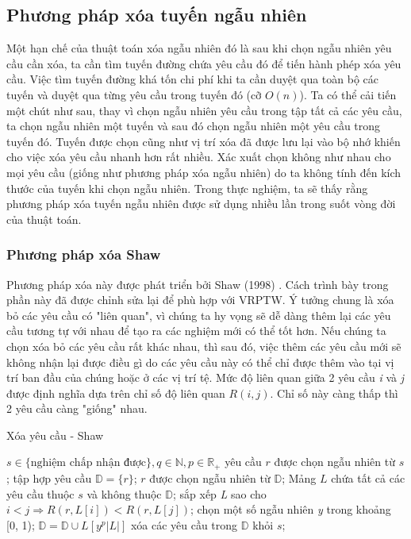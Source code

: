 \subsection*{Phương pháp xóa tuyến ngẫu nhiên}
Một hạn chế của thuật toán xóa ngẫu nhiên đó là sau khi chọn ngẫu nhiên yêu cầu cần xóa, ta cần tìm tuyến đường chứa yêu cầu đó để tiến hành phép xóa yêu cầu. Việc tìm tuyến đường khá tốn chi phí khi ta cần duyệt qua toàn bộ các tuyến và duyệt qua từng yêu cầu trong tuyến đó (cỡ $O(n)$). Ta có thể cải tiến một chút như sau, thay vì chọn ngẫu nhiên yêu cầu trong tập tất cả các yêu cầu, ta chọn ngẫu nhiên một tuyến và sau đó chọn ngẫu nhiên một yêu cầu trong tuyến đó. Tuyến được chọn cũng như vị trí xóa đã được lưu lại vào bộ nhớ khiến cho việc xóa yêu cầu nhanh hơn rất nhiều. Xác xuất chọn không như nhau cho mọi yêu cầu (giống như phương pháp xóa ngẫu nhiên) do ta không tính đến kích thước của tuyến khi chọn ngẫu nhiên. Trong thực nghiệm, ta sẽ thấy rằng phương pháp xóa tuyến ngẫu nhiên được sử dụng nhiều lần trong suốt vòng đời của thuật toán.

\subsubsection*{Phương pháp xóa Shaw}
Phương pháp xóa này được phát triển bởi Shaw (1998) \cite{shaw1998using}. Cách trình bày trong phần này đã được chỉnh sửa lại để phù hợp với VRPTW. Ý tưởng chung là xóa bỏ các yêu cầu có "liên quan", vì chúng ta hy vọng sẽ dễ dàng thêm lại các yêu cầu tương tự với nhau để tạo ra các nghiệm mới có thể tốt hơn. Nếu chúng ta chọn xóa bỏ các yêu cầu rất khác nhau, thì sau đó, việc thêm các yêu cầu mới sẽ không nhận lại được điều gì do các yêu cầu này có thể chỉ được thêm vào tại vị trí ban đầu của chúng hoặc ở các vị trí tệ. Mức độ liên quan giữa 2 yêu cầu \textit{i} và \textit{j} được định nghĩa dựa trên chỉ số độ liên quan $R(i,j)$. Chỉ số này càng thấp thì 2 yêu cầu càng "giống" nhau.

\begin{algorithm}
	\caption{Xóa yêu cầu - Shaw}
	\begin{algorithmic}[1]
		\Require $s \in \text{\{nghiệm chấp nhận được\}}, q \in \mathbb{N}, p \in \mathbb{R}_{+}$
		\State yêu cầu $r$ được chọn ngẫu nhiên từ $s$;
		\State tập hợp yêu cầu $\mathbb{D}=\{r\}$;
		\State $r$ được chọn ngẫu nhiên từ $\mathbb{D}$;
		\State Mảng $L$ chứa tất cả các yêu cầu thuộc $s$ và không thuộc $\mathbb{D}$;
		\State sắp xếp \textit{L} sao cho $i<j \Rightarrow R(r, L\left[ i \right]) < R(r, L\left[ j \right])$;
		\State chọn một số ngẫu nhiên \textit{y} trong khoảng [0, 1);
		\State $\mathbb{D}=\mathbb{D}\cup {L \left[ y^p|L| \right]}$
		\EndWhile
		\State xóa các yêu cầu trong $\mathbb{D}$ khỏi $s$;
	\end{algorithmic}
\end{algorithm}

